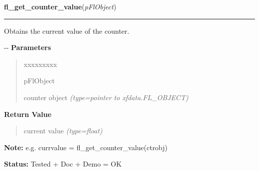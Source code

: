 \hspace{.8\funcindent}\begin{boxedminipage}{\funcwidth}

    \raggedright \textbf{fl\_get\_counter\_value}(\textit{pFlObject})

    \vspace{-1.5ex}

    \rule{\textwidth}{0.5\fboxrule}
\setlength{\parskip}{2ex}

Obtains the current value of the counter.

-{}-
\setlength{\parskip}{1ex}
      \textbf{Parameters}
      \vspace{-1ex}

      \begin{quote}
        \begin{Ventry}{xxxxxxxxx}

          \item[pFlObject]


counter object
            {\it (type=pointer to xfdata.FL\_OBJECT)}

        \end{Ventry}

      \end{quote}

      \textbf{Return Value}
    \vspace{-1ex}

      \begin{quote}

current value
      {\it (type=float)}

      \end{quote}

\textbf{Note:} 
e.g. currvalue = fl\_get\_counter\_value(ctrobj)


\textbf{Status:} 
Tested + Doc + Demo = OK


    \end{boxedminipage}

    \label{xformslib:flcounter:fl_get_counter_bounds}

    \vspace{0.5ex}

